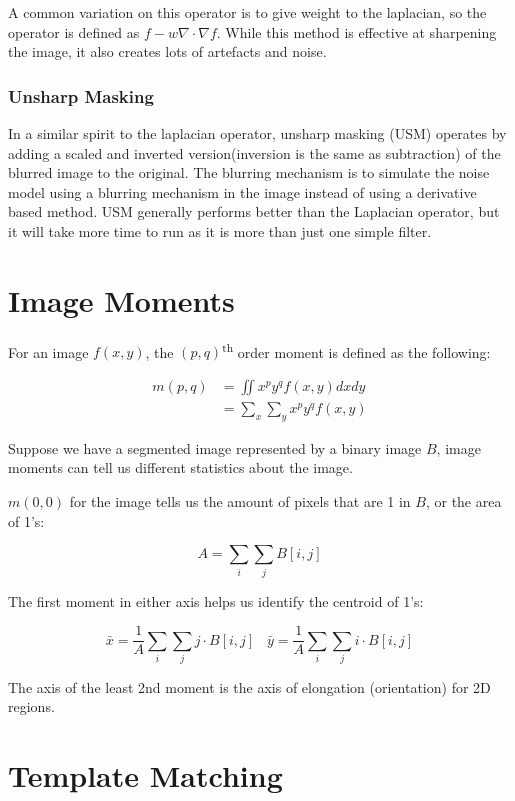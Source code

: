 \documentclass{article}
\begin{document}
\begin{multicols}{3}
A common variation on this operator is to give weight to the laplacian, so the operator is defined as $f - w \nabla \cdot \nabla f$. While this method is effective at sharpening the image, it also creates lots of artefacts and noise.

\subsubsection{Unsharp Masking}

In a similar spirit to the laplacian operator, unsharp masking (USM) operates by adding a scaled and inverted version(inversion is the same as subtraction) of the blurred image to the original. The blurring mechanism is to simulate the noise model using a blurring mechanism in the image instead of using a derivative based method. USM generally performs better than the Laplacian operator, but it will take more time to run as it is more than just one simple filter.

\section{Image Moments}

For an image $f(x,y)$, the $(p,q)$\textsuperscript{th} order moment is defined as the following:

\[
\begin{aligned}
  m(p,q) &= \iint x^p y^q f(x,y) dxdy\\
         &= \sum_x \sum_y x^p y^q f(x,y)
\end{aligned}  
\]

Suppose we have a segmented image represented by a binary image $B$, image moments can tell us different statistics about the image.

$m(0,0)$ for the image tells us the amount of pixels that are 1 in $B$, or the area of 1's:

$$
A = \sum_i \sum_j B[i,j]
$$

The first moment in either axis helps us identify the centroid of 1's:

$$
\bar x = \frac{1}{A}\sum_i \sum_j j \cdot B[i,j] \;\;\; \bar y = \frac{1}{A} \sum_i \sum_j i \cdot B[i,j]
$$

The axis of the least 2nd moment is the axis of elongation (orientation) for 2D regions.

\section{Template Matching}


\end{multicols}
\end{document}
